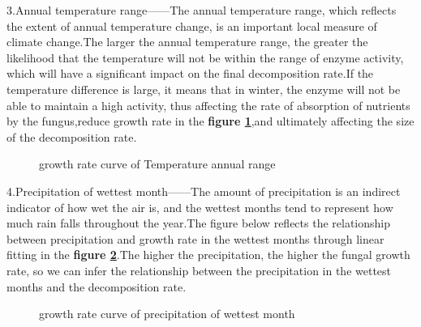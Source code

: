 \documentclass[12pt]{article}
\begin{document}
3.Annual temperature range——The annual temperature range, which reflects the extent of annual temperature change, is an important local measure of climate change.The larger the annual temperature range, the greater the likelihood that the temperature will not be within the range of enzyme activity, which will have a significant impact on the final decomposition rate.If the temperature difference is large, it means that in winter, the enzyme will not be able to maintain a high activity, thus affecting the rate of absorption of nutrients by the fungus,reduce growth rate in the \textbf{figure \ref{figure:Temperature_Annual_Range_growth_rate}},and ultimately affecting the size of the decomposition rate.\par

\begin{figure}[h]
	\centering
	\caption{growth rate curve of Temperature annual range}
	\label{figure:Temperature_Annual_Range_growth_rate}
\end{figure}

4.Precipitation of wettest month——The amount of precipitation is an indirect indicator of how wet the air is, and the wettest months tend to represent how much rain falls throughout the year.The figure below reflects the relationship between precipitation and growth rate in the wettest months through linear fitting in the \textbf{figure \ref{figure:Precipitation_of_Wettest_Month_growth_rate}}.The higher the precipitation, the higher the fungal growth rate, so we can infer the relationship between the precipitation in the wettest months and the decomposition rate.\par

\begin{figure}[h]
	\centering
	\caption{growth rate curve of precipitation of wettest month}
	\label{figure:Precipitation_of_Wettest_Month_growth_rate}
\end{figure}
\end{document}
